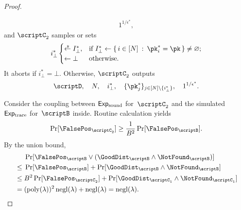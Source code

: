 \begin{proof}
\begin{itemize}
\begin{align*}
1^{1/\epsilon^\ast},
\end{align*}
and $\scriptC_2$ samples or sets
\begin{align*}
i_\bot^\ast\begin{cases}
\draws I_\bot^\ast,&\textup{if }
I_\bot^\ast\gets
\{\,
{i\in[N]}
\::\:
{\pk_i^\ast=\pk}
\,\}\neq\varnothing;\\
\gets\bot&\textup{otherwise}.
\end{cases}
\end{align*}
It aborts if ${i_\bot^\ast=\bot}$.
Otherwise, $\scriptC_2$ outputs
\begin{align*}
\scriptD,\quad
N,\quad
i_\bot^\ast,\quad
\{\pk_j^\ast\}_{j\in{[N]\setminus{\{i_\bot^\ast\}}}},\quad
1^{1/\epsilon^\ast}.
\end{align*}
\end{itemize}
Consider the coupling between $\ExpSound$ for~$\scriptC_2$
and the simulated $\ExpTrace$ for~$\scriptB$ inside.
Routine calculation yields
\begin{align*}
\Pr[\FalsePos_{\scriptC_2}]
\geq\frac{1}{B^2}\Pr[\FalsePos_\scriptB].
\end{align*}
By the union bound,
\begin{align*}
&
\Pr[\FalsePos_\scriptB\vee(\GoodDist_\scriptB\wedge\NotFound_\scriptB)]
\\{}\leq{}&
\Pr[\FalsePos_\scriptB]
+
\Pr[\GoodDist_\scriptB\wedge\NotFound_\scriptB]
\\{}\leq{}&
B^2\Pr[\FalsePos_{\scriptC_2}]
+
\Pr[\GoodDist_{\scriptC_1}\wedge\NotFound_{\scriptC_1}]
\WideNarrow{}{\hspace*{-1em}}
\\{}={}&
(\poly(\lambda))^2\negl(\lambda)+\negl(\lambda)
=
\negl(\lambda).
\qedhere
\end{align*}
\end{proof}

